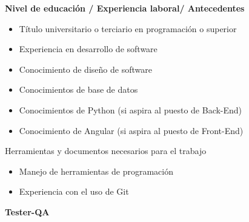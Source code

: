 \begin{itemize}
\begin{itemize}
                \end{itemize}
			{\correccionTexto                
            \item \textbf{Nivel de educación / Experiencia laboral/ Antecedentes}
                \begin{itemize}
                    \item Título universitario o terciario en programación o superior
                    \item Experiencia en desarrollo de software
                    \item Conocimiento de diseño de software
                    \item Conocimientos de base de datos
                    \item Conocimientos de Python (si aspira al puesto de Back-End)
                    \item Conocimiento de Angular (si aspira al puesto de Front-End)
                \end{itemize}
            \item Herramientas y documentos necesarios para el trabajo
            	\begin{itemize}
                    \item Manejo de herramientas de programación
                    \item Experiencia con el uso de Git
                \end{itemize}
			}                
		\end{itemize}
  
    	\textbf{Tester-QA}  
    	          	  
